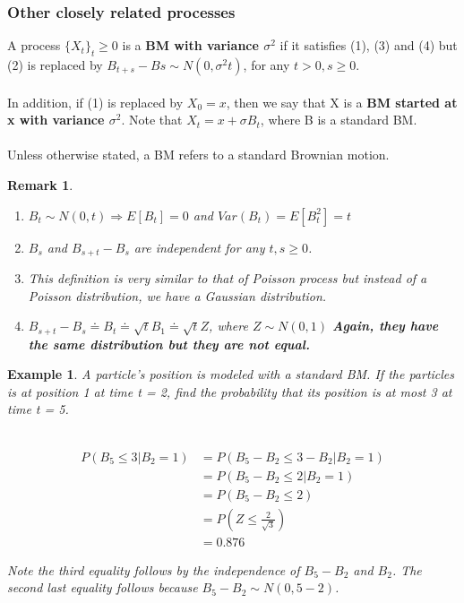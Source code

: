 \documentclass[12pt]{article}
\newtheorem*{remark}{Remark}
\newtheorem{example}{Example}
\begin{document}
\subsubsection{Other closely related processes}

A process $\{X_t\}_t\geq0$ is a \textbf{BM with variance $\sigma ^2$} if it satisfies (1), (3) and (4) but (2) is replaced by $B_{t+s}-B{s} \sim N(0,\sigma ^2t)$, for any $t > 0, s \geq 0$.
\\
\\In addition, if (1) is replaced by $X_0 = x$, then we say that X is a \textbf{BM started at x with variance $\sigma^2$}. Note that $X_t = x + \sigma B_t$, where B is a standard BM.
\\
\\Unless otherwise stated, a BM refers to a standard Brownian motion.

\begin{remark}
    \begin{enumerate}
        \item $B_t \sim N(0,t) \Rightarrow E[B_t] = 0$ and $Var(B_t) = E[B_t^2] = t$
        \item $B_s$ and $B_{s+t} - B_{s}$ are independent for any $t, s \geq 0$.
        \item This definition is very similar to that of Poisson process but instead of a Poisson distribution, we have a Gaussian distribution.
        \item $B_{s+t} - B_{s} \doteq B_t \doteq \sqrt{t}B_1 \doteq \sqrt{t}Z$, where $Z \sim N(0,1)$ \textbf{Again, they have the same distribution but they are not equal.}
    \end{enumerate}
\end{remark}

\begin{example}
    A particle's position is modeled with a standard BM. If the particles is at position 1 at time t = 2, find the probability that its position is at most 3 at time t = 5.
    \\
    \\
    \begin{center}
        \begin{align*}
            P(B_5 \leq 3 | B_2 = 1) & = P(B_5 - B_2 \leq 3 - B_2 | B_2 = 1) \\
            & = P(B_5 - B_2 \leq 2 | B_2 = 1) \\
            & = P(B_5 - B_2 \leq 2) \\
            & = P(Z \leq \frac{2}{\sqrt{3}}) \\
            & = 0.876
        \end{align*}
    \end{center}
    Note the third equality follows by the independence of $B_5-B_2$ and $B_2$. The second last equality follows because $B_5 - B_2 \sim N(0, 5-2)$.
\end{example}
\end{document}
